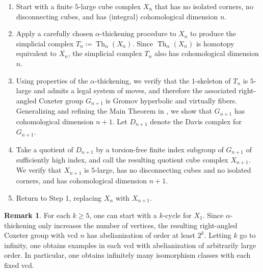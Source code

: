 \documentclass[12pt, letterpaper]{article}
\newcommand{\Th}{\operatorname{Th}}
\theoremstyle{plain}
\theoremstyle{definition}
\newtheorem{rmk}[thm]{Remark}
\begin{document}
\begin{enumerate}
    \item Start with a finite $5$-large cube complex $X_n$ that has no isolated corners, no disconnecting cubes, and has (integral) cohomological dimension $n$. 

    \item Apply a carefully chosen $\alpha$-thickening procedure to $X_n$ to produce the simplicial complex $T_n\coloneqq\Th_\alpha(X_n)$. Since $\Th_\alpha(X_n)$ is homotopy equivalent to $X_n$, the simplicial complex $T_n$ also has cohomological dimension $n$.

    \item Using properties of the $\alpha$-thickening, we verify that the $1$-skeleton of $T_n$ is $5$-large and admits a legal system of moves, and therefore the associated right-angled Coxeter group $G_{n+1}$ is Gromov hyperbolic and virtually fibers. Generalizing and refining the Main Theorem in \cite{osajda}, we show that $G_{n+1}$ has cohomological dimension $n+1$.
    Let $D_{n+1}$ denote the Davis complex for $G_{n+1}$.

    \item Take a quotient of $D_{n+1}$ by a torsion-free finite index subgroup of $G_{n+1}$ of sufficiently high index, and call the resulting quotient cube complex $X_{n+1}$. We verify that $X_{n+1}$ is $5$-large, has no disconnecting cubes and no isolated corners, and has cohomological dimension $n+1$.    

    \item Return to Step 1, replacing $X_n$ with $X_{n+1}$.
\end{enumerate}

\begin{rmk}
    For each $k \geq 5$, one can start with a $k$-cycle for $X_1$. Since $\alpha$-thickening only increases the number of vertices, the resulting right-angled Coxeter group with vcd $n$ has abelianization of order at least $2^k$. Letting $k$ go to infinity, one obtains examples in each vcd with abelianization of arbitrarily large order. In particular, one obtains infinitely many isomorphism classes with each fixed vcd.
\end{rmk}
\end{document}
